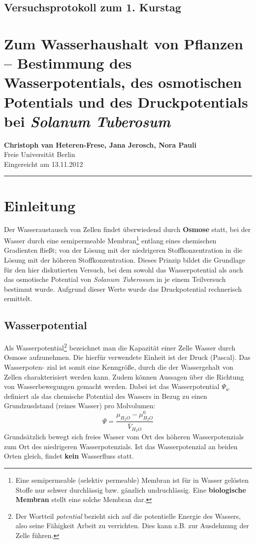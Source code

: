 \documentclass[11pt,a4paper,DIV=10,]{scrartcl}
\begin{document}
\onecolumn
\subsection*{Versuchsprotokoll zum 1. Kurstag }
\section*{Zum Wasserhaushalt von Pflanzen -- Bestimmung des Wasserpotentials, des osmotischen Potentials  und des Druckpotentials bei \textit{Solanum Tuberosum}}
\textbf{Christoph van Heteren-Frese\footnotemark[1], Jana Jerosch\footnotemark[1], Nora Pauli\footnotemark[1]} \\[0.1cm]
\footnotemark[1]Freie Universität Berlin\\[0.2cm]
Eingereicht am 13.11.2012\\
\hrule
%
\section*{Einleitung}    
Der Wasseraustausch von Zellen findet überwiedend durch \textbf{Osmose} statt, bei der Wasser durch eine semipermeable Membran\footnote{Eine semipermeable (selektiv permeable) Membran ist für in Wasser gelösten Stoffe nur schwer durchlässig bzw. gänzlich undruchlässig. Eine \textbf{biologische Membran} stellt eine solche Membran dar.}  entlang eines chemischen Gradienten fließt; von der Lösung mit der niedrigeren Stoff\-konzentration in die Lösung mit der höheren Stoff\-konzentration. Dieses Prinzip bildet die Grundlage für den hier diskutierten Versuch, bei dem sowohl das Wasserpotential als auch das osmotische Potential von \textit{Solanum Tuberosum} in je einem Teilversuch bestimmt wurde. Aufgrund dieser Werte wurde das Druckpotential rechnerisch ermittelt.
\subsection*{Wasserpotential}
Als Wasserpotential\footnote{Der Wortteil \textit{potential} bezieht sich auf die potentielle Energie des Wassers, also seine Fähigkeit Arbeit zu verrichten. Dies kann z.B. zur Ausdehnung der Zelle führen.} bezeichnet man die Kapazität einer Zelle Wasser durch Osmose
aufzunehmen. Die hierfür verwendete Einheit ist der Druck (Pascal). Das Wasserpoten-
zial ist somit eine Kenngröße, durch die der Wassergehalt von Zellen charakterisiert
werden kann. Zudem können Aussagen über die Richtung von Wasserbewegungen gemacht werden. Dabei ist das Wasserpotential $\Psi_w$ definiert als das chemische Potential des
Wassers in Bezug zu einen Grundzusdstand (reines Wasser) pro Molvolumen:
\begin{equation}
\Psi=\dfrac{\mu_{H_2O}-\mu^0_{H_2O}}{\overline{V}_{H_2O}}
\end{equation}
Grundsätzlich bewegt sich freies Wasser vom Ort des höheren Wasserpotenzials zum Ort des
niedrigeren Wasserpotenzials. Ist das Wasserpotenzial an beiden Orten gleich, findet
\textbf{kein} Wasserfluss statt. \citep[vgl.][S. 52]{schopfer_pflanzenphysiologie_2010}
\end{document}
